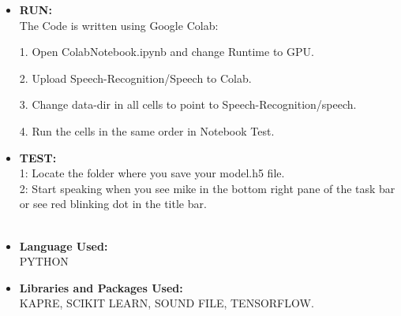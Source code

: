 \documentclass{article}
\begin{document}
\begin{itemize}
\item{\textbf{RUN:}}\\

The Code is written using Google Colab:\\

\item[1.]{Open ColabNotebook.ipynb and change Runtime to GPU.}

\item[2.]{Upload Speech-Recognition/Speech to Colab.}


\item[3.]{Change data-dir in all cells to point to Speech-Recognition/speech.}

\item[4.]{Run the cells in the same order in Notebook Test.}
\\

\item{\textbf{TEST:}}\\


1: Locate the folder where you save your model.h5 file.\\

2: Start speaking when you see mike in the bottom right pane of the task bar or see red blinking dot in the title bar.\\

\\


\item{\textbf{Language Used:}}\\

PYTHON\\

\item{\textbf{Libraries and Packages Used:}}\\

KAPRE, SCIKIT LEARN, SOUND FILE, TENSORFLOW.\\

\end{itemize}
\end{document}

